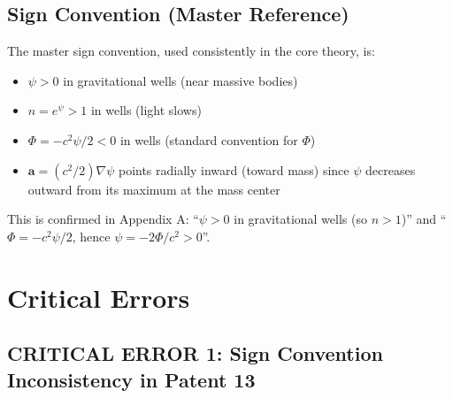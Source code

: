 \documentclass[12pt,a4paper]{article}
\begin{document}
\subsection{Sign Convention (Master Reference)}

The master sign convention, used consistently in the core theory, is:
\begin{itemize}[nosep]
\item $\psi > 0$ in gravitational wells (near massive bodies)
\item $n = e^\psi > 1$ in wells (light slows)
\item $\Phi = -c^2\psi/2 < 0$ in wells (standard convention for $\Phi$)
\item $\mathbf{a} = (c^2/2)\nabla\psi$ points radially inward (toward mass)
since $\psi$ decreases outward from its maximum at the mass center
\end{itemize}

This is confirmed in Appendix A: ``$\psi > 0$ in gravitational wells (so
$n > 1$)'' and ``$\Phi = -c^2\psi/2$, hence $\psi = -2\Phi/c^2 > 0$''.

\section{Critical Errors}
\label{sec:critical}

\subsection{CRITICAL ERROR 1: Sign Convention Inconsistency in Patent 13}
\label{sec:crit1}
\end{document}
